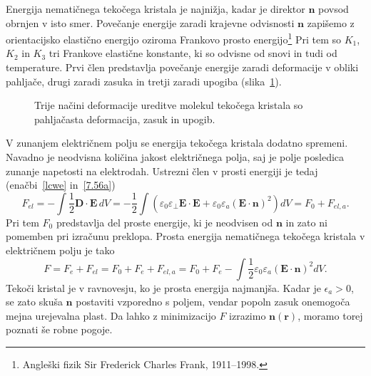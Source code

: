 Energija nematičnega tekočega kristala je najnižja, kadar je direktor $\mathbf{n}$
povsod obrnjen v isto smer. Povečanje energije zaradi krajevne odvisnosti $\mathbf{n}$
zapišemo z orientacijsko elastično energijo oziroma Frankovo prosto 
energijo\footnote{Angleški fizik Sir Frederick Charles Frank, 1911--1998.}
Pri tem so $K_{1}$, $K_{2}$ in $K_{3}$ tri Frankove elastične
konstante, ki so odvisne od snovi in tudi od temperature. 
Prvi člen predstavlja povečanje energije zaradi deformacije v obliki 
pahljače, drugi zaradi zasuka in tretji zaradi upogiba (slika~\ref{s7.20}).
\begin{figure}[h]
\centering
\def\svgwidth{140truemm} 

\caption{Trije načini deformacije ureditve molekul tekočega kristala so pahljačasta deformacija,
zasuk in upogib.}
\label{s7.20}
\end{figure}

V zunanjem električnem polju se energija tekočega kristala dodatno spremeni. 
Navadno je neodvisna količina jakost električnega polja, saj je polje posledica
zunanje napetosti na elektrodah. Ustrezni člen v prosti energiji je tedaj 
(enačbi~\ref{lcwe} in~\ref{7.56a})
\begin{equation}
F_{el} = -\int \frac{1}{2} \mathbf{D}\cdot\mathbf{E}\, dV= -\frac{1}{2} \int
\left( \varepsilon_0 \varepsilon_\bot \mathbf{E}\cdot\mathbf{E} + 
\varepsilon_{0}\varepsilon_{a}(\mathbf{E}\cdot\mathbf{n})^{2}\right)dV = F_0 + F_{el,a}.
\end{equation}
Pri tem $F_{0}$ predstavlja del proste energije, ki je neodvisen od $\mathbf{n}$ in 
zato ni pomemben pri izračunu preklopa. Prosta energija
nematičnega tekočega kristala v električnem polju je tako 
\begin{equation}
F=F_e + F_{el} = F_0 + F_e + F_{el,a} = F_{0}+F_{e}-\int \frac{1}{2}\varepsilon_{0}\varepsilon_{a}
(\mathbf{E}\cdot \mathbf{n})^{2}dV.
\label{7.72}
\end{equation}
Tekoči kristal je v ravnovesju, ko je prosta energija najmanjša. Kadar je
$\epsilon_{a}>0$, se zato skuša $\mathbf{n}$ postaviti vzporedno s
poljem, vendar popoln zasuk onemogoča mejna urejevalna plast. 
Da lahko z minimizacijo $F$ izrazimo $\mathbf{n}(\mathbf{r})$, moramo
torej poznati še robne pogoje.

